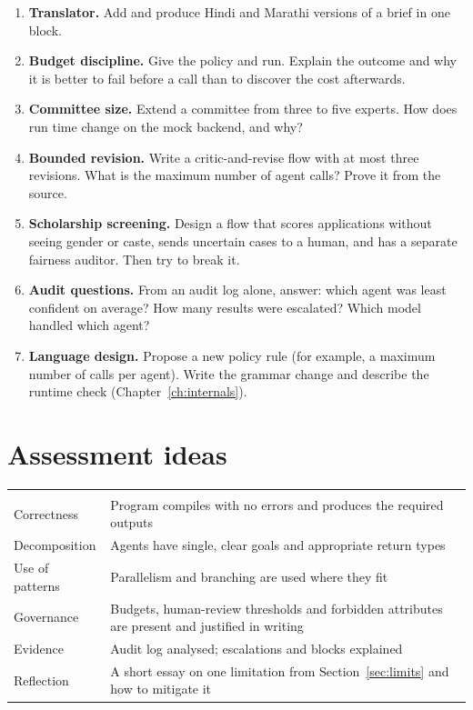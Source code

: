 \begin{enumerate}
  \item \textbf{Translator.} Add  and produce Hindi and Marathi versions of a brief in one  block.
  \item \textbf{Budget discipline.} Give  the policy  and run. Explain the outcome and why it is better to fail before a call than to discover the cost afterwards.
  \item \textbf{Committee size.} Extend a committee from three to five experts. How does run time change on the mock backend, and why?
  \item \textbf{Bounded revision.} Write a critic-and-revise flow with at most three revisions. What is the maximum number of agent calls? Prove it from the source.
  \item \textbf{Scholarship screening.} Design a flow that scores applications without seeing gender or caste, sends uncertain cases to a human, and has a separate fairness auditor. Then try to break it.
  \item \textbf{Audit questions.} From an audit log alone, answer: which agent was least confident on average? How many results were escalated? Which model handled which agent?
  \item \textbf{Language design.} Propose a new policy rule (for example, a maximum number of calls per agent). Write the grammar change and describe the runtime check (Chapter~\ref{ch:internals}).
\end{enumerate}

\section{Assessment ideas}

\begin{center}
\small
\begin{tabularx}{\linewidth}{@{}L{3.6cm}Y@{}}
\toprule
{} & \\
\goldrule
Correctness & Program compiles with no errors and produces the required outputs\\
Decomposition & Agents have single, clear goals and appropriate return types\\
Use of patterns & Parallelism and branching are used where they fit\\
Governance & Budgets, human-review thresholds and forbidden attributes are present and justified in writing\\
Evidence & Audit log analysed; escalations and blocks explained\\
Reflection & A short essay on one limitation from Section~\ref{sec:limits} and how to mitigate it\\
\bottomrule
\end{tabularx}
\end{center}

